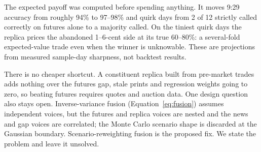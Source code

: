 The expected payoff was computed before spending anything. It moves 9:29
accuracy from roughly 94\% to 97--98\% and quirk days from 2 of 12
strictly called correctly on futures alone to a majority called. On the
tiniest quirk days the replica prices the abandoned 1--6-cent side at its
true 60--80\%: a several-fold expected-value trade even when the winner
is unknowable. These are projections from measured sample-day sharpness,
not backtest results.

There is no cheaper shortcut. A constituent replica built from pre-market
trades adds nothing over the futures gap, stale prints and regression
weights going to zero, so beating futures requires quotes and auction
data. One design question also stays open. Inverse-variance fusion
(Equation~\ref{eq:fusion}) assumes independent voices, but the futures
and replica voices are nested
and the news and gap voices are correlated; the Monte Carlo scenario
shape is discarded at the Gaussian boundary. Scenario-reweighting fusion
is the proposed fix. We state the problem and leave it unsolved.

